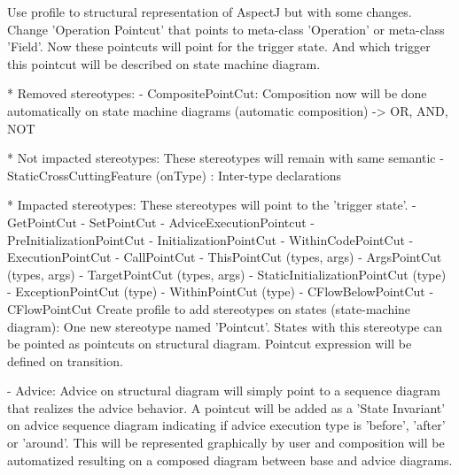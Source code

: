 Use \cite{evermann:07} profile to structural representation of AspectJ but with
some changes. Change 'Operation Pointcut' that points to meta-class 'Operation'
or meta-class 'Field'. Now these pointcuts will point for the trigger state. And
which trigger this pointcut will be described on state machine diagram.


* Removed stereotypes:
 - CompositePointCut: Composition now will be done automatically on state
 machine diagrams (automatic composition) -> OR, AND, NOT

* Not impacted stereotypes: These stereotypes will remain with same semantic
 - StaticCrossCuttingFeature (onType) : Inter-type declarations
 
* Impacted stereotypes: These stereotypes will point to the 'trigger state'.
 - GetPointCut
 - SetPointCut
 - AdviceExecutionPointcut
 - PreInitializationPointCut
 - InitializationPointCut
 - WithinCodePointCut
 - ExecutionPointCut
 - CallPointCut
 - ThisPointCut (types, args)
 - ArgsPointCut (types, args)
 - TargetPointCut (types, args)
 - StaticInitializationPointCut (type)
 - ExceptionPointCut (type)
 - WithinPointCut (type)
 - CFlowBelowPointCut
 - CFlowPointCut
 Create profile to add stereotypes on states (state-machine diagram): One new
 stereotype named 'Pointcut'. States with this stereotype can be pointed as 
 pointcuts on structural diagram. Pointcut expression will be defined on
 transition.

 - Advice: Advice on structural diagram will simply point to a sequence diagram
 that realizes the advice behavior. A pointcut will be added as a 'State
 Invariant' on advice sequence diagram indicating if advice execution type is
 'before', 'after' or 'around'. This will be represented graphically by user and
 composition will be automatized resulting on a composed diagram between base
 and advice diagrams.
 